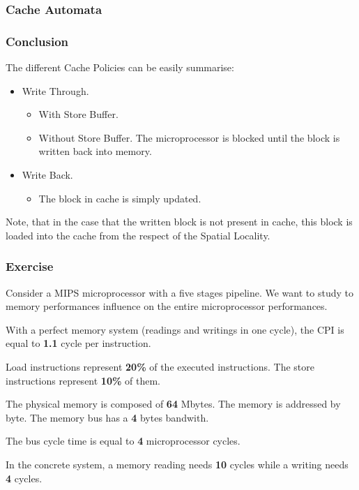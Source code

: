 
\begin{frame}
  \frametitle{Cache Automata}

  \begin{center}
  \end{center}
\end{frame}


\begin{frame}
  \frametitle{Conclusion}

  The different Cache Policies can be easily summarise:

  \begin{itemize}[<+->]
    \item
      Write Through.

      \begin{itemize}
	\item
	  With Store Buffer.
	\item
	  Without Store Buffer. The microprocessor is blocked until the
	  block is written back into memory.
      \end{itemize}

    \item
      Write Back.

      \begin{itemize}
	\item
	  The block in cache is simply updated.
      \end{itemize}
  \end{itemize}

  Note, that in the case that the written block is not present in cache,
  this block is loaded into the cache from the respect of the Spatial
  Locality.
\end{frame}


\begin{frame}
  \frametitle{Exercise}

  Consider a MIPS microprocessor with a five stages pipeline. We want to
  study to memory performances influence on the entire microprocessor
  performances.

  \nl

  With a perfect memory system (readings and writings in one cycle),
  the CPI is equal to \textbf{1.1} cycle per instruction.

  \nl

  Load instructions represent \textbf{20\%} of the executed instructions.
  The store instructions represent \textbf{10\%} of them.

  \nl

  The physical memory is composed of \textbf{64} Mbytes. The memory
  is addressed by byte. The memory bus has a \textbf{4} bytes bandwith.

  \nl

  The bus cycle time is equal to \textbf{4} microprocessor cycles.

  \nl

  In the concrete system, a memory reading needs \textbf{10} cycles while
  a writing needs \textbf{4} cycles.
\end{frame}

